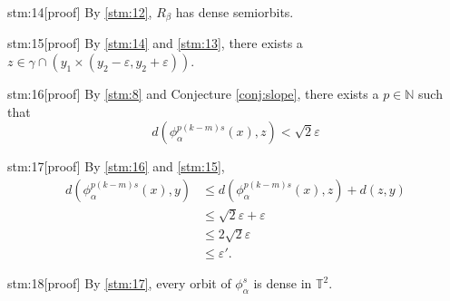 \begin{stm}{stm:14}[proof]
By \ref{stm:12}, $R_\beta$ has dense semiorbits.
\end{stm}

\begin{stm}{stm:15}[proof]
By \ref{stm:14} and \ref{stm:13}, there exists a $z \in \gamma \cap (y_1 \times (y_2 - \varepsilon, y_2 + \varepsilon))$.
\end{stm}

\begin{stm}{stm:16}[proof]
By \ref{stm:8} and Conjecture \ref{conj:slope}, there exists a $p \in \mathbb{N}$ such that $$d(\phi_\alpha^{p(k-m)s}(x), z) < \sqrt{2} \varepsilon$$
\end{stm}

\begin{stm}{stm:17}[proof]
By \ref{stm:16} and \ref{stm:15},
\begin{align*}
d(\phi_\alpha^{p(k-m)s}(x), y)
&\le d(\phi_\alpha^{p(k-m)s}(x), z) + d(z, y) \\
&\le \sqrt{2} \varepsilon + \varepsilon \\
&\le 2\sqrt{2} \varepsilon \\
&\le \varepsilon'.
\end{align*}
\end{stm}


\begin{stm}{stm:18}[proof]
By \ref{stm:17}, every orbit of $\phi_\alpha^s$ is dense in $\mathbb{T}^2$.
\end{stm}

